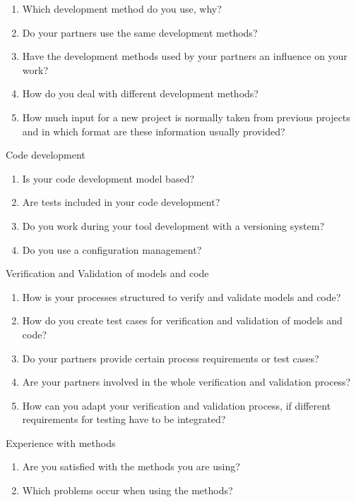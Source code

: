 \documentclass{./template/openetcs2}
\begin{document}
{\begin{enumerate}
\begin{enumerate}
	 \item Which development method do you use, why?
	 \item Do your partners use the same development methods?
	 \item Have the development methods used by your partners an influence on your work?
	 \item	How do you deal with different development methods?
	 \item	How much input for a new project is normally taken from previous projects and in which format are these information usually provided?
	\end{enumerate}


  {\Large \item   Code development}



\begin{enumerate}
  \item  Is your code development model based?
  \item  Are tests included in your code development?
  \item  Do you work during your tool development with a versioning system?
  \item  Do you use a configuration management?
\end{enumerate}

  {\Large \item  Verification and Validation of models and code}

\begin{enumerate}
  \item  How is your processes structured to verify and validate models and code?
  \item  How do you create test cases for verification and validation of models and code?
  \item  Do your partners provide certain process requirements or test cases?
  \item  Are your partners involved in the whole verification and validation process?
  \item  How can you adapt your verification and validation process, if different requirements for testing have to be integrated?
\end{enumerate}

  {\Large \item   Experience with methods}

\begin{enumerate}
  \item  Are you satisfied with the methods you are using?
  \item  Which problems occur when using the methods?
\end{enumerate}



\end{enumerate}}
\end{document}
